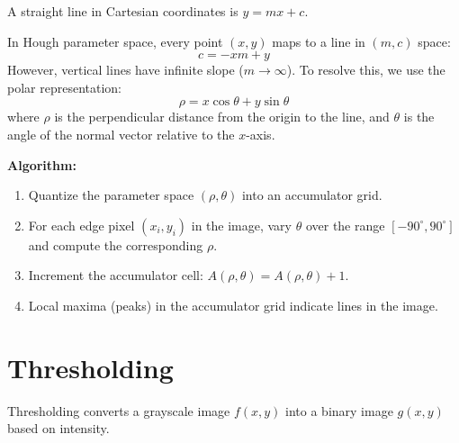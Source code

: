 \documentclass[12pt,a4paper]{article}
\begin{document}
\begin{tcolorbox}[formulabox, title={Hough Transform Formulations}]
A straight line in Cartesian coordinates is $y = mx + c$.
\par\noindent
In Hough parameter space, every point $(x,y)$ maps to a line in $(m,c)$ space:
\begin{equation}
  c = -x m + y
\end{equation}
However, vertical lines have infinite slope ($m \to \infty$). To resolve this, we use the polar representation:
\begin{equation}
  \rho = x \cos\theta + y \sin\theta
\end{equation}
where $\rho$ is the perpendicular distance from the origin to the line, and $\theta$ is the angle of the normal vector relative to the $x$-axis.
\par\noindent
\textbf{Algorithm:}
\begin{enumerate}[leftmargin=*, itemsep=2pt]
  \item Quantize the parameter space $(\rho, \theta)$ into an accumulator grid.
  \item For each edge pixel $(x_i, y_i)$ in the image, vary $\theta$ over the range $[-90^\circ, 90^\circ]$ and compute the corresponding $\rho$.
  \item Increment the accumulator cell: $A(\rho, \theta) = A(\rho, \theta) + 1$.
  \item Local maxima (peaks) in the accumulator grid indicate lines in the image.
\end{enumerate}
\end{tcolorbox}

\section{Thresholding}

Thresholding converts a grayscale image $f(x,y)$ into a binary image $g(x,y)$ based on intensity.
\end{document}
